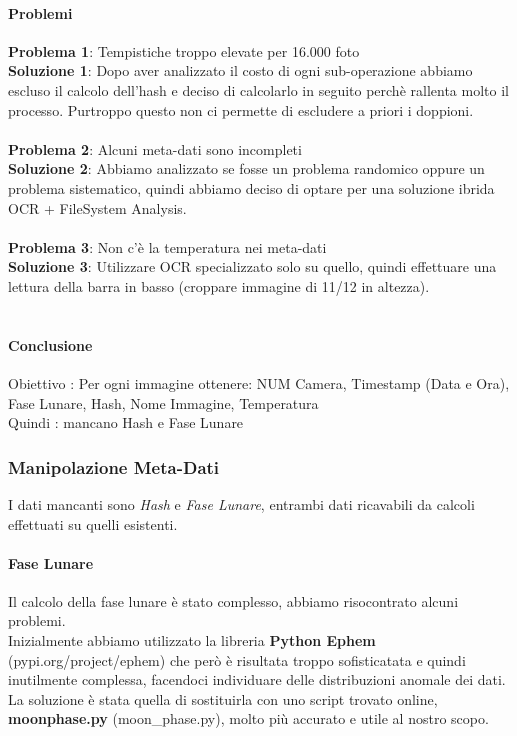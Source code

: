 \documentclass[12pt,a4paper,twoside]{article}
\begin{document}
\paragraph{Problemi}
\textbf{Problema 1}: Tempistiche troppo elevate per 16.000 foto\\
\textbf{Soluzione 1}: Dopo aver analizzato il costo di ogni sub-operazione abbiamo escluso il calcolo 
dell'hash e deciso di calcolarlo in seguito perchè rallenta molto il processo. Purtroppo questo non ci 
permette di escludere a priori i doppioni.\\
\\
\textbf{Problema 2}: Alcuni meta-dati sono incompleti\\
\textbf{Soluzione 2}: Abbiamo analizzato se fosse un problema randomico oppure un problema sistematico, 
quindi abbiamo deciso di optare per una soluzione ibrida OCR + FileSystem Analysis.\\
\\
\textbf{Problema 3}: Non c'è la temperatura nei meta-dati\\
\textbf{Soluzione 3}: Utilizzare OCR specializzato solo su quello, quindi effettuare una lettura della 
barra in basso (croppare immagine di 11/12 in altezza).\\
\\

\paragraph{Conclusione}
Obiettivo : Per ogni immagine ottenere: NUM Camera, Timestamp (Data e Ora), Fase Lunare, Hash, Nome
Immagine, Temperatura\\
Quindi : mancano Hash e Fase Lunare

\subsubsection{Manipolazione Meta-Dati}
I dati mancanti sono \textit{Hash} e \textit{Fase Lunare}, entrambi dati ricavabili da calcoli effettuati
su quelli esistenti.\\

\paragraph{Fase Lunare}
Il calcolo della fase lunare è stato complesso, abbiamo risocontrato alcuni problemi.\\
Inizialmente abbiamo utilizzato la libreria \textbf{Python Ephem} (pypi.org/project/ephem) che però è 
risultata troppo sofisticatata e quindi inutilmente complessa, facendoci individuare delle distribuzioni 
anomale dei dati. La soluzione è stata quella di sostituirla con uno script trovato online, 
\textbf{moonphase.py} (moon\_phase.py), molto più accurato e utile al nostro scopo.
\end{document}
